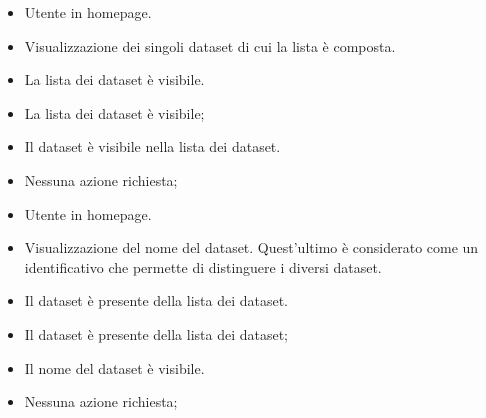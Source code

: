     \newpage

    \UCdsc
    { %
        \begin{itemize}
            \item Utente in homepage.
        \end{itemize}
    }
    { %
        \begin{itemize}
            \item Visualizzazione dei singoli dataset di cui la lista è composta.
        \end{itemize}
    }
    { %
        \begin{itemize}
            \item La lista dei dataset è visibile.
        \end{itemize}
    }
    { %
        \begin{itemize}
            \item La lista dei dataset è visibile;
            \item Il dataset è visibile nella lista dei dataset.
        \end{itemize}
    }
    { %
        \begin{itemize}
            \item Nessuna azione richiesta;
        \end{itemize}
    }

    \UCdsc
    { %
        \begin{itemize}
            \item Utente in homepage.
        \end{itemize}
    }
    { %
        \begin{itemize}
            \item Visualizzazione del nome del dataset. Quest'ultimo è considerato come un identificativo che permette di distinguere i diversi dataset.
        \end{itemize}
    }
    { %
        \begin{itemize}
            \item Il dataset è presente della lista dei dataset.
        \end{itemize}
    }
    { %
        \begin{itemize}
            \item Il dataset è presente della lista dei dataset;
            \item Il nome del dataset è visibile.
        \end{itemize}
    }
    { %
        \begin{itemize}
            \item Nessuna azione richiesta;
        \end{itemize}
    }


